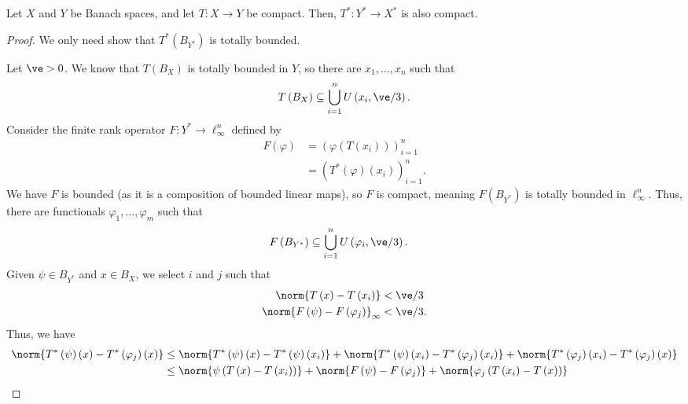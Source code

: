 \documentclass[10pt]{mypackage}
\begin{document}
\begin{proposition}
  Let $X$ and $Y$ be Banach spaces, and let $T: X\rightarrow Y$ be compact. Then, $T^{\ast}:Y^{\ast}\rightarrow X^{\ast}$ is also compact.
\end{proposition}
\begin{proof}
  We only need show that $T^{\ast}\left(B_{Y^{\ast}}\right)$ is totally bounded.\newline

  Let $\ve > 0$. We know that $T\left(B_{X}\right)$ is totally bounded in $Y$, so there are $x_1,\dots,x_n$ such that
  \begin{align*}
    T\left(B_{X}\right)\subseteq \bigcup_{i=1}^{n}U\left(x_{i},\ve/3\right).
  \end{align*}
  Consider the finite rank operator $F: Y^{\ast}\rightarrow \ell_{\infty}^{n}$ defined by
  \begin{align*}
    F\left(\varphi\right) &= \left(\varphi\left(T\left(x_i\right)\right)\right)_{i=1}^{n}\\
                          &= \left(T^{\ast}\left(\varphi\right)\left(x_{i}\right)\right)_{i=1}^{n}.
  \end{align*}
  We have $F$ is bounded (as it is a composition of bounded linear maps), so $F$ is compact, meaning $F\left(B_{Y^{\ast}}\right)$ is totally bounded in $\ell_{\infty}^{n}$. Thus, there are functionals $\varphi_{1},\dots,\varphi_{m}$ such that
  \begin{align*}
    F\left(B_{Y^{\ast}}\right) &\subseteq \bigcup_{i=1}^{n}U\left(\varphi_{i},\ve/3\right).
  \end{align*}
  Given $\psi\in B_{Y^{\ast}}$ and $x\in B_{X}$, we select $i$ and $j$ such that
  \begin{align*}
    \norm{T\left(x\right) - T\left(x_{i}\right)} &< \ve/3\\
    \norm{F\left(\psi\right) - F\left(\varphi_{j}\right)}_{\infty} &< \ve/3.
  \end{align*}
  Thus, we have
  \begin{align*}
    \norm{T^{\ast}\left(\psi\right)\left(x\right) - T^{\ast}\left(\varphi_{j}\right)\left(x\right)} &\leq \norm{T^{\ast}\left(\psi\right)\left(x\right) - T^{\ast}\left(\psi\right)\left(x_{i}\right)} + \norm{T^{\ast}\left(\psi\right)\left(x_i\right) - T^{\ast}\left(\varphi_{j}\right)\left(x_i\right)} + \norm{T^{\ast}\left(\varphi_{j}\right)\left(x_i\right) - T^{\ast}\left(\varphi_{j}\right)\left(x\right)}\\
                                                                                                    &\leq \norm{\psi\left(T\left(x\right) - T\left(x_{i}\right)\right)} + \norm{F\left(\psi\right) - F\left(\varphi_{j}\right)} + \norm{\varphi_{j}\left(T\left(x_i\right) - T\left(x\right)\right)}\\

\end{align*}
\end{proof}
\end{document}
